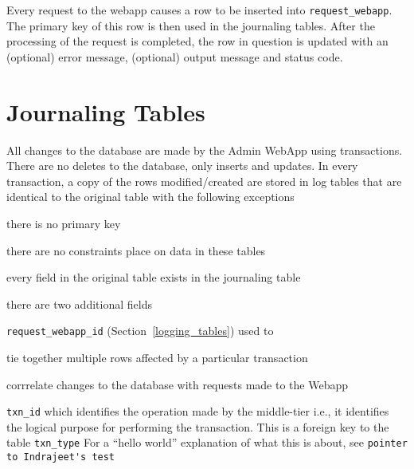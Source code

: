 \documentclass[letterpaper]{article}
\begin{document}
Every request to the webapp causes a row to be inserted into
\verb+request_webapp+. The primary key of this row is then used in the
journaling tables. After the processing of the request is completed, the row in
question is updated with an (optional) error message, (optional) output message and status code.

\section{Journaling Tables}
\label{journaling_tables}

All changes to the database are made by the Admin WebApp using transactions.
There are no deletes to the database, only inserts and updates. 
In every transaction, a copy of the rows modified/created are stored in log
tables that are identical to the original table with the following exceptions
\be
\item there is no primary key
\item there are no constraints place on data in these tables
\item every field in the original table exists in the journaling table
\item there are two additional fields
  \be
\item \verb+request_webapp_id+ (Section~\ref{logging_tables}) used to 
  \be
\item tie together multiple rows affected by a particular transaction
\item corrrelate changes to the database with requests made to the Webapp
  \ee
\item \verb+txn_id+ which identifies the operation made by the middle-tier i.e.,
  it identifies the logical purpose for performing the transaction. This is a
  foreign key to the table \verb+txn_type+
  \ee
  \ee
For a ``hello world'' explanation of what this is about, see 
\verb+pointer to Indrajeet's test+
\end{document}
